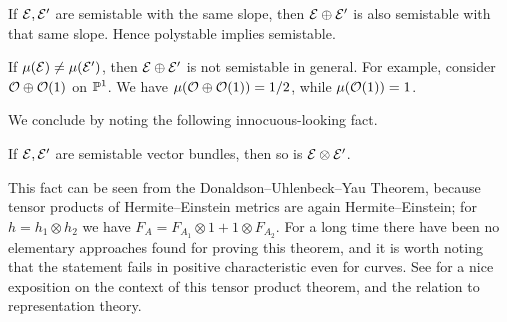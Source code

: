 \begin{corollary}
    If $\calE,\calE'$ are semistable with the same slope, then
    $\calE\oplus\calE'$ is also semistable with that same slope. Hence
    polystable implies semistable.
\end{corollary}

\begin{remark}
    If $\mu(\calE)\ne\mu(\calE')$, then $\calE\oplus\calE'$ is not semistable in
    general. For example, consider $\O\oplus\O(1)$ on $\P^1$. We have
    $\mu(\O\oplus\O(1))=1/2$, while $\mu(\O(1))=1$.
\end{remark}

We conclude by noting the following innocuous-looking fact.

\begin{theorem}
    If $\calE,\calE'$ are semistable vector bundles, then so is
    $\calE\otimes\calE'$.
\end{theorem}

This fact can be seen from the Donaldson--Uhlenbeck--Yau Theorem, because tensor
products of Hermite--Einstein metrics are again Hermite--Einstein; for
$h=h_1\otimes h_2$ we have $F_A=F_{A_1}\otimes1+1\otimes F_{A_2}$. For a long
time there have been no elementary approaches found for proving this theorem,
and it is worth noting that the statement fails in positive characteristic even
for curves. See \cite{maculan_18} for a nice exposition on the context of this
tensor product theorem, and the relation to representation theory.
